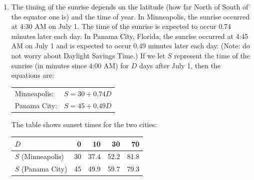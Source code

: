 \documentclass[12pt]{article}
\begin{document}
\begin{enumerate}
\newpage %
\item The timing of the sunrise depends on the latitude (how far North of South of the equator one is) and the time of year.  In Minneapolis, the sunrise occurred at 4:30 AM on July 1.  The time of the sunrise is expected to occur 0.74 minutes later each day.  In Panama City, Florida, the sunrise occurred at 4:45 AM on July 1 and is expected to occur 0.49 minutes later each day.  (Note: do not worry about Daylight Savings Time.) If we let $S$ represent the time of the sunrise (in minutes since 4:00 AM) for $D$ days after July 1, then the equations are:

\vspace{.1in}

\begin{center}
\begin{tabular} {ll} 
Minneapolis: &$S=30+0.74D$ \\
Panama City: & $S=45+0.49D$ \\
\end{tabular}
\end{center}

The table shows sunset times for the two cities:

\begin{center}
\begin{tabular} {|l|r|r|r|r|} \hline
$D$ & 0 & 10 & 30 & 70 \\ \hline
$S$ (Minneapolis) & 30 &  37.4 & 52.2 & 81.8  \\ \hline
$S$ (Panama City) & 45 & 49.9 & 59.7 & 79.3 \\ \hline
\end{tabular}
\end{center}


\begin{enumerate}


\end{enumerate}
\end{enumerate}
\end{document}

